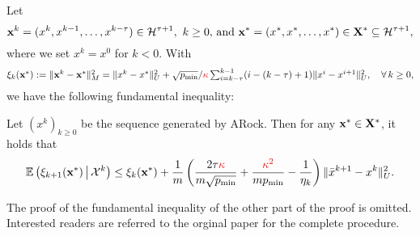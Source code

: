 {Let 
\begin{equation*}%
\vx^k=(x^k,x^{k-1},\ldots,x^{k-\tau})\in \cH^{\tau+1},~k\ge 0,\,\mbox{and}~ \vx^* =(x^*,x^*,\ldots,x^*)\in\vX^*\subseteq\cH^{\tau+1},
\end{equation*}
where we set $x^{k}=x^{0}$ for $k<0$. With
\begin{equation}\label{eqn:xi}
\textstyle \xi_k(\vx^*) := \|\vx^k-\vx^*\|_M^2=\|x^{k} - x^*\|_U^2 +
\sqrt{p_{\min}}/{\color{red}{\kappa}}\sum_{i=k-\tau}^{k-1} (i-(k-\tau)+1) \|
x^{i} - x^{i+1}\|_U^2,\quad\forall\,k\ge 0,
\end{equation}
we have the following fundamental inequality:
\begin{thm}\label{thm:fund_inquality}
Let $(x^k)_{k\geq 0}$ be the sequence generated by ARock. Then for any ${\mathbf{x}}^*\in{\mathbf{X}}^*$, it holds that %
\begin{equation}\label{eqn:fund_inquality}
\begin{aligned}
\mathbb{E}\left(\xi_{k+1}(\vx^*) \,\big|\, \cX^k\right)  
\leq  \xi_k(\vx^*)  + \frac{1}{m}
\left(\frac{2\tau{\color{red}{\kappa}}}{m\sqrt{p_{\min}}} +
{{\color{red}{\kappa^2}}\over mp_{\min}} - \frac{1}{ \eta_k}\right)
\|\bar{x}^{k+1} - x^k \|_U^2.
\end{aligned}
\end{equation}
\end{thm}

The proof of the fundamental inequality of the other part of the proof is omitted. Interested readers are referred to the orginal paper \cite{Peng_2015_AROCK} for the complete procedure.
}